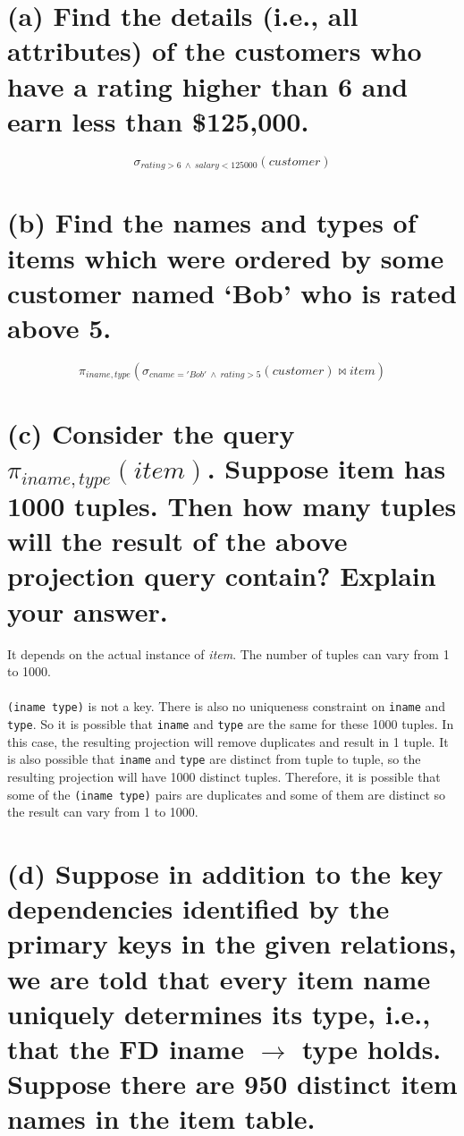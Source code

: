 \documentclass{article}
\begin{document}
\section{(a) Find the details (i.e., all attributes) of the customers who have a rating higher than 6 and earn less than \$125,000.}
\[
\sigma_{rating > 6 \  \wedge \ salary < 125000}(customer)
\]

\section{(b) Find the names and types of items which were ordered by some customer named `Bob' who is rated above 5.}
\[
\pi_{iname, type}(\sigma_{cname='Bob' \ \wedge \ rating > 5}(customer) \bowtie item)
\]

\section{(c) Consider the query \(\pi_{iname,type}(item)\). Suppose item has 1000 tuples. Then how many tuples
will the result of the above projection query contain? Explain your answer.}

It depends on the actual instance of \textit{item}. The number of tuples can vary from 1 to 1000.\\
\\
\texttt{(iname type)} is not a key. There is also no uniqueness constraint on \texttt{iname} and \texttt{type}. So it is possible that \texttt{iname} and \texttt{type} are the same for these 1000 tuples. In this case, the resulting projection will remove duplicates and result in 1 tuple. It is also possible that \texttt{iname} and \texttt{type} are distinct from tuple to tuple, so the resulting projection will have 1000 distinct tuples. Therefore, it is possible that some of the \texttt{(iname type)} pairs are duplicates and some of them are distinct so the result can vary from 1 to 1000.


\section{(d) Suppose in addition to the key dependencies identified by the primary keys in the given
relations, we are told that every item name uniquely determines its type, i.e., that the FD
iname \(\to\) type holds. Suppose there are 950 distinct item names in the item table.}
\end{document}

